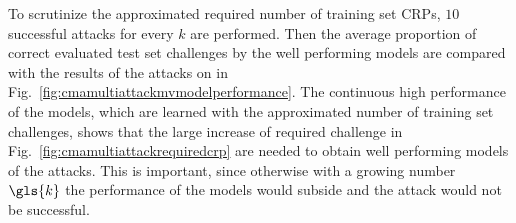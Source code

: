 To scrutinize the approximated required number of training set \acp{CRP}, $10$ successful attacks for every $k$ are performed.
Then the average proportion of correct evaluated test set challenges by the well performing models are compared with the results of the attacks on \xpufs in Fig.\ \ref{fig:cmamultiattackmvmodelperformance}.
The continuous high performance of the models, which are learned with the approximated number of training set challenges, shows that the large increase of required challenge in Fig.\ \ref{fig:cmamultiattackrequiredcrp} are needed to obtain well performing models of the attacks.
This is important, since otherwise with a growing number $\gls{k}$ the performance of the models would subside and the attack would not be successful.


